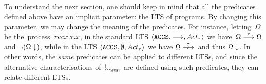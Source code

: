 


  To understand the next section, one should
  keep in mind that all the predicates defined
  above have an implicit parameter: the LTS of programs. %
  By changing this parameter, we may change the meaning of the
  predicates.
  For instance, letting~$\Omega$ be the~\ACCS process~$\rec{\tau. x}$, in the standard LTS
  $\lts{\ACCS}{\st{}}{\Acttau}$ we have~$ \Omega \mathrel{\overset{ \tau }\longrightarrow} \Omega$
  and $\lnot (\Omega \downarrow)$, while in the LTS $\lts{\ACCS}{ \emptyset
  }{\Acttau}$ we have $\Omega \Nst{\tau}\,$ and thus $\Omega \downarrow$.
  In other words, the {\em same} predicates can be applied to
  different LTSs, and since the alternative characterisations
  of~$\testleqS$ are defined using such predicates, they
  can relate different LTSs.
